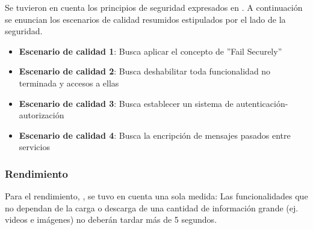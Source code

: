 Se tuvieron en cuenta los principios de seguridad expresados en \cite{security_ws}. A continuación se enuncian los escenarios de calidad resumidos estipulados por el lado de la seguridad.

\begin{itemize}
	\item \textbf{Escenario de calidad 1}: Busca aplicar el concepto de ''Fail Securely''
	\item \textbf{Escenario de calidad 2}: Busca deshabilitar toda funcionalidad no terminada y accesos a ellas
	\item \textbf{Escenario de calidad 3}: Busca establecer un sistema de autenticación-autorización
	\item \textbf{Escenario de calidad 4}: Busca la encripción de mensajes pasados entre servicios
\end{itemize}

\subsubsection{Rendimiento}

Para el rendimiento, \cite{time_response}, se tuvo en cuenta una sola medida: Las funcionalidades que no dependan de la carga o descarga de una cantidad de información grande (ej. videos e imágenes) no deberán tardar más de 5 segundos.